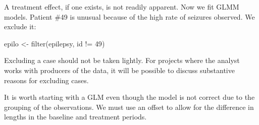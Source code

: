 \documentclass[
  ignorenonframetext,
]{beamer}
\newenvironment{Shaded}{\begin{snugshade}}{\end{snugshade}}
\newcommand{\DecValTok}[1]{\textcolor[rgb]{0.00,0.00,0.81}{#1}}
\newcommand{\FunctionTok}[1]{\textcolor[rgb]{0.00,0.00,0.00}{#1}}
\newcommand{\NormalTok}[1]{#1}
\newcommand{\OtherTok}[1]{\textcolor[rgb]{0.56,0.35,0.01}{#1}}
\newcommand{\SpecialCharTok}[1]{\textcolor[rgb]{0.00,0.00,0.00}{#1}}
\begin{document}
\begin{frame}[fragile]{}
\protect\hypertarget{section-6}{}
A treatment effect, if one exists, is not readily apparent. Now we fit
GLMM models. Patient \#49 is unusual because of the high rate of
seizures observed. We exclude it:

\vspace{12pt}
\small

\begin{Shaded}
\begin{Highlighting}[]
\NormalTok{epilo }\OtherTok{\textless{}{-}} \FunctionTok{filter}\NormalTok{(epilepsy, id }\SpecialCharTok{!=} \DecValTok{49}\NormalTok{)}
\end{Highlighting}
\end{Shaded}

\vspace{12pt}
\normalsize

Excluding a case should not be taken lightly. For projects where the
analyst works with producers of the data, it will be possible to discuss
substantive reasons for excluding cases.

It is worth starting with a GLM even though the model is not correct due
to the grouping of the observations. We must use an offset to allow for
the difference in lengths in the baseline and treatment periods.
\end{frame}
\end{document}
